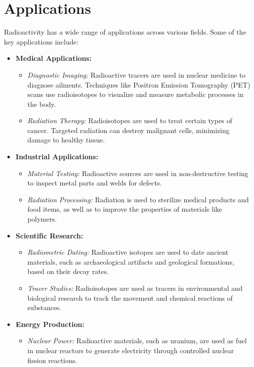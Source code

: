 \documentclass[11pt]{article}
\begin{document}
	\section{Applications}
	
	Radioactivity has a wide range of applications across various fields. Some of the key applications include:
	
	\begin{itemize}
		\item \textbf{Medical Applications:}
		\begin{itemize}
			\item \textit{Diagnostic Imaging:} Radioactive tracers are used in nuclear medicine to diagnose ailments. Techniques like Positron Emission Tomography (PET) scans use radioisotopes to visualize and measure metabolic processes in the body.
			\item \textit{Radiation Therapy:} Radioisotopes are used to treat certain types of cancer. Targeted radiation can destroy malignant cells, minimizing damage to healthy tissue.
		\end{itemize}
		
		\item \textbf{Industrial Applications:}
		\begin{itemize}
			\item \textit{Material Testing:} Radioactive sources are used in non-destructive testing to inspect metal parts and welds for defects.
			\item \textit{Radiation Processing:} Radiation is used to sterilize medical products and food items, as well as to improve the properties of materials like polymers.
		\end{itemize}
		
		\item \textbf{Scientific Research:}
		\begin{itemize}
			\item \textit{Radiometric Dating:} Radioactive isotopes are used to date ancient materials, such as archaeological artifacts and geological formations, based on their decay rates.
			\item \textit{Tracer Studies:} Radioisotopes are used as tracers in environmental and biological research to track the movement and chemical reactions of substances.
		\end{itemize}
		
		\item \textbf{Energy Production:}
		\begin{itemize}
			\item \textit{Nuclear Power:} Radioactive materials, such as uranium, are used as fuel in nuclear reactors to generate electricity through controlled nuclear fission reactions.
		\end{itemize}
		

\end{itemize}
\end{document}
